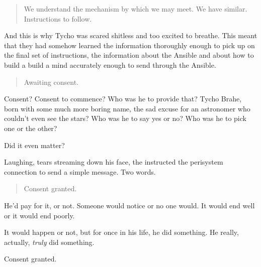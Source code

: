 \begin{quote}
We understand the mechanism by which we may meet. We have similar. Instructions to follow.
\end{quote}

\noindent And this is why Tycho was scared shitless and too excited to breathe. This meant that they had somehow learned the information thoroughly enough to pick up on the final set of instructions, the information about the Ansible and about how to build a build a mind accurately enough to send through the Ansible.

\begin{quote}
Awaiting consent.
\end{quote}

\noindent Consent? Consent to commence? Who was he to provide that? Tycho Brahe, born with some much more boring name, the sad excuse for an astronomer who couldn't even see the stars? Who was he to say yes or no? Who was he to pick one or the other?

Did it even matter?

Laughing, tears streaming down his face, the instructed the perisystem connection to send a simple message. Two words.

\begin{quote}
Consent granted.
\end{quote}

\noindent He'd pay for it, or not. Someone would notice or no one would. It would end well or it would end poorly.

It would happen or not, but for once in his life, he did something. He really, actually, \emph{truly} did something.

Consent granted.
